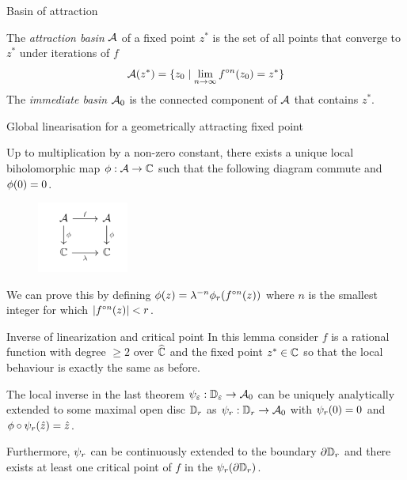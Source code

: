 \begin{frame}{Basin of attraction}
    \begin{definition}
        \label{intro:dfn:basin}
        The \emph{attraction basin} $\mathcal{A}$ of a fixed point $z^*$ is the set of all points that converge to $z^*$ under iterations of $f$
        \begin{equation*}
            \mathcal{A}(z^*) = \{z_0\mid \lim_{n \rightarrow \infty} f^{\circ n}(z_0) = z^*\}
        \end{equation*}
        The \emph{immediate basin} $\mathcal{A}_0$ is the connected component of $\mathcal{A}$ that contains $z^*$.
    \end{definition}
\end{frame}
\begin{frame}{Global linearisation for a geometrically attracting fixed point}
    \begin{theorem} 
        \label{8:thm:attlinglob}
        Up to multiplication by a non-zero constant, there exists a unique local biholomorphic map $\phi:\mathcal{A}\to\mathbb{C}$ such that the following diagram commute and $\phi(0)=0$.
    \end{theorem}
 
     \begin{figure}
    \centering
    \includegraphics[width=3cm]{resources/ch-08/graph2.png}
    \end{figure} 
    
    We can prove this by defining $\phi(z)=\lambda^{-n}\phi_r(f^{\circ n}(z))$ where $n$ is the smallest integer for which $\left|f^{\circ n}(z)\right|<r$.
\end{frame}

\begin{frame}{Inverse of linearization and critical point}
    In this lemma consider $f$ is a rational function with degree $\geq 2$ over $\widehat{\mathbb{C}}$ and the fixed point $z^* \in \mathbb{C}$ so that the local behaviour is exactly the same as before.
    \begin{lemma}
    The local inverse in the last theorem $\psi_{\varepsilon}: \mathbb{D}_{\varepsilon} \to \mathcal{A}_{0}$ can be uniquely analytically extended to some maximal open disc $\mathbb{D}_{r}$ as $\psi_r: \mathbb{D}_{r} \to \mathcal{A}_{0}$ with $\psi_r(0)=0$ and $\phi\circ \psi_r(\hat{z}) = \hat{z}$. 
    
    Furthermore, $\psi_r$  can be continuously extended to the boundary $\partial \mathbb{D}_{r}$ and there exists at least one critical point of $f$ in the $\psi_r(\partial \mathbb{D}_{r})$.
    \end{lemma}
\end{frame}

